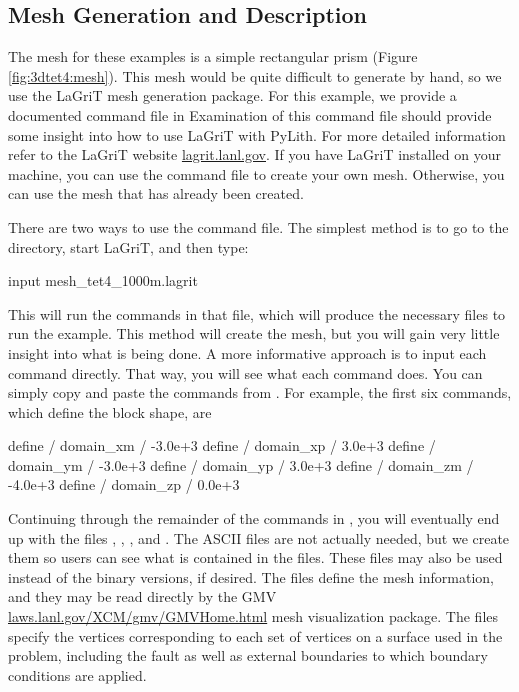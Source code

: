 \subsection{Mesh Generation and Description}

The mesh for these examples is a simple rectangular prism (Figure
\vref{fig:3dtet4:mesh}). This mesh would be quite difficult to generate
by hand, so we use the LaGriT mesh generation package. For this example,
we provide a documented command file in 
Examination of this command file should provide some insight into
how to use LaGriT with PyLith. For more detailed information refer
to the LaGriT website \url{lagrit.lanl.gov}. If you have LaGriT installed
on your machine, you can use the command file to create your own mesh.
Otherwise, you can use the mesh that has already been created.

There are two ways to use the command file. The simplest method is
to go to the  directory, start LaGriT, and then type:
\begin{shell}
input mesh_tet4_1000m.lagrit
\end{shell}
This will run the commands in that file, which will produce the necessary
files to run the example. This method will create the mesh, but you
will gain very little insight into what is being done. A more informative
approach is to input each command directly. That way, you will see
what each command does. You can simply copy and paste the commands
from . For example, the first six
commands, which define the block shape, are
\begin{shell}
define / domain_xm / -3.0e+3
define / domain_xp /  3.0e+3
define / domain_ym / -3.0e+3
define / domain_yp /  3.0e+3
define / domain_zm / -4.0e+3
define / domain_zp /  0.0e+3 
\end{shell}
Continuing through the remainder of the commands in ,
you will eventually end up with the files ,
, ,
and . The ASCII files are not actually
needed, but we create them so users can see what is contained in the
files. These files may also be used instead of the binary versions,
if desired. The  files define the mesh information, and
they may be read directly by the GMV \url{laws.lanl.gov/XCM/gmv/GMVHome.html}
mesh visualization package. The  files specify the vertices
corresponding to each set of vertices on a surface used in the problem,
including the fault as well as external boundaries to which boundary
conditions are applied.

